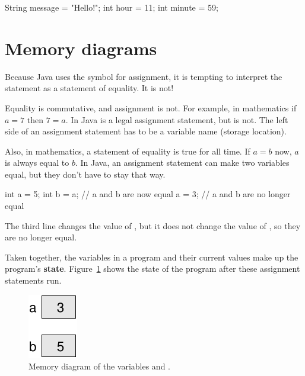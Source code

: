 \begin{code}
String message = "Hello!";
int hour = 11;
int minute = 59;
\end{code}

%
%
%


\section{Memory diagrams}
\label{state}

Because Java uses the \java{=} symbol for assignment, it is tempting to interpret the statement  as a statement of equality.
It is not!

Equality is commutative, and assignment is not.
For example, in mathematics if $a = 7$ then $7 = a$.
In Java  is a legal assignment statement, but  is not.
The left side of an assignment statement has to be a variable name (storage location).

Also, in mathematics, a statement of equality is true for all time.
If $a = b$ now, $a$ is always equal to $b$.
In Java, an assignment statement can make two variables equal, but they don't have to stay that way.

\begin{code}
int a = 5;
int b = a;     // a and b are now equal
a = 3;         // a and b are no longer equal
\end{code}

The third line changes the value of , but it does not change the value of , so they are no longer equal.


Taken together, the variables in a program and their current values make up the program's {\bf state}.
Figure~\ref{fig.state} shows the state of the program after these assignment statements run.

\begin{figure}[!ht]
\begin{center}
\includegraphics{figs/state.pdf}
\caption{Memory diagram of the variables  and .}
\label{fig.state}
\end{center}
\end{figure}

